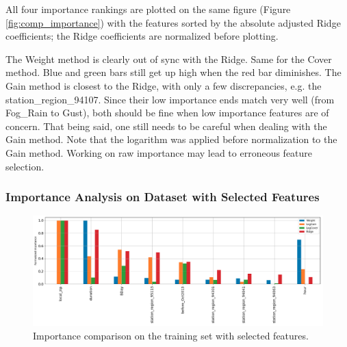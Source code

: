 \documentclass[a4paper]{article}
\begin{document}
			All four importance rankings are plotted on the same figure (Figure \ref{fig:comp_importance}) with the features sorted by the absolute adjusted Ridge coefficients; the Ridge coefficients are normalized before plotting.
			
			The Weight method is clearly out of sync with the Ridge. Same for the Cover method. Blue and green bars still get up high when the red bar diminishes. The Gain method is closest to the Ridge, with only a few discrepancies, e.g. the station\_region\_94107. Since their low importance ends match very well (from Fog\_Rain to Gust), both should be fine when low importance features are of concern. That being said, one still needs to be careful when dealing with the Gain method. Note that the logarithm was applied before normalization to the Gain method. Working on raw importance may lead to erroneous feature selection.

			\subsubsection{Importance Analysis on Dataset with Selected Features}		
			
			\begin{figure}
				\centering
				\includegraphics[width=1\textwidth]{SelImportance.png}
				\caption{\label{fig:sel_importance}Importance comparison on the training set with selected features.}	
			\end{figure}
			
\end{document}

